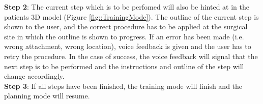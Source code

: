 \textbf{Step 2}: The current step which is to be perfomed will also be hinted at in the patients 3D model (Figure \ref{fig::TrainingMode}).
The outline of the current step is shown to the user, and the correct procedure has to be applied at the surgical site in which the outline is shown to progress.
If an error has been made (i.e. wrong attachment, wrong location), voice feedback is given and the user has to retry the procedure.
In the case of success, the voice feedback will signal that the next step is to be performed and the instructions and outline of the step will change accordingly.
\\
\textbf{Step 3}: If all steps have been finished, the training mode will finish and the planning mode will resume.
